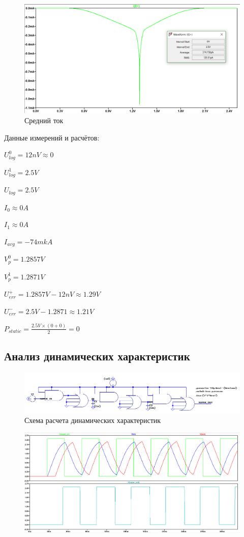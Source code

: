 \documentclass[a4paper,14pt]{article}
\begin{document}
\begin{figure}[H]
	\centering		
	\includegraphics[width=\linewidth]{image/dc_I_avg}
	\caption{Средний ток}\label{img:dc_I_avg}
\end{figure}

Данные измерений и расчётов:

$U_{log}^0 = 12 nV \approx 0$

$U_{log}^1 = 2.5 V$

$U_{log} = 2.5 V$

$I_0 \approx 0 A $

$I_1 \approx 0 A $

$I_{avg} = -74 mkA $

$V_p^0 = 1.2857V$

$V_p^1 = 1.2871V$

$U_{err}^{+} = 1.2857V - 12nV \approx 1.29V $

$U_{err}^{-} = 2.5V - 1.2871 \approx 1.21V $

$P_{static} = \frac{2.5V \times (0 + 0)}{2} = 0$

\subsection{Анализ динамических характеристик}

\begin{figure}[H]
	\centering
	\includegraphics[width=0.7\linewidth]{image/dyn_shema_min}
	\caption{Схема расчета динамических характеристик}
	\label{fig:dynshema}
\end{figure}

\begin{figure}[H]
	\centering
	\includegraphics[width=\linewidth]{image/dyn_max_freq}
	\caption{}
	\label{fig:dyn_max_freq}
\end{figure}
\end{document}
